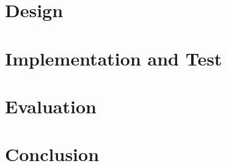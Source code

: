 \documentclass[12pt,a4paper]{report}
\begin{document}
	\chapter{Design}
	\chapter{Implementation and Test}
	\chapter{Evaluation}
	\chapter{Conclusion}

	
	
\end{document}
